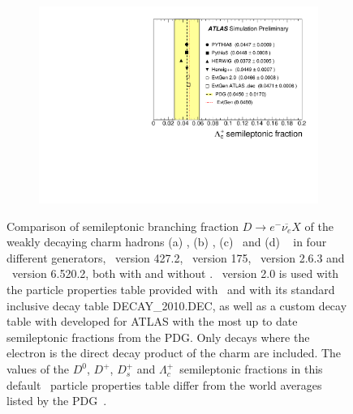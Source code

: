 \begin{figure}
\begin{subfigure}[]{0.45\textwidth}
\end{subfigure}
\begin{subfigure}[]{0.45\textwidth}
\includegraphics[width=\textwidth]{evtgen/figures/EvtGen/h_Lambdac_sl.pdf}
\end{subfigure}
\caption{Comparison of semileptonic branching fraction $D\rightarrow e^-\overline{\nu_e} X$
of the weakly decaying charm hadrons 
(a) \Dzero, (b) \Dplus, (c) \Ds\ and (d) \Lc~
in four different generators,
\Pythia\ version 427.2, \PythiaE\ version 175, \Herwigpp\  version 2.6.3 and \Herwig\ version 6.520.2, 
both with and without
\EvtGen.  
\EvtGen\ version 2.0 is used with the particle properties table provided with \EvtGen\ and with 
its standard inclusive decay table DECAY\_2010.DEC, as well as a custom decay table with developed for ATLAS with the most up to date semileptonic fractions from the PDG.
Only decays where the electron is the direct decay product of the charm are included.
The values of the $D^0$, $D^+$, $D^+_s$ and $\Lambda^+_c$~semileptonic fractions in this default 
\EvtGen\  particle properties table differ from the world averages listed by the PDG~\cite{PhysRevD.86.010001}.}
\label{fig:csl}
\end{figure}
